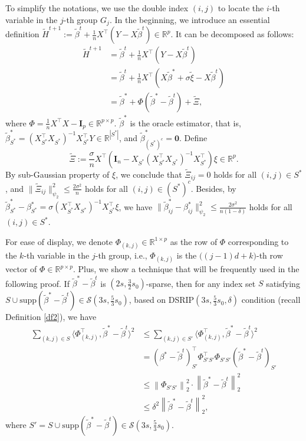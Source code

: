 \documentclass[12pt]{article}
\begin{document}
\begin{appendix}
To simplify the notations, we use the double index $(i,j)$ to locate the $i$-th variable in the $j$-th group $G_j$.
In the beginning, we introduce an essential definition $\tilde H^{t+1} := \tilde \beta^{t } + \frac1nX^\top \left(Y-X\tilde \beta^{t} \right) \in \mathbb R^p$.
It can be decomposed as follows: 
\begin{align*}
\tilde H^{t+1} &=  \tilde \beta^{t } + \frac1nX^\top \left(Y-X\tilde \beta^{t } \right) \\
&=  \tilde \beta^{t } + \frac1nX^\top \left(X \tilde \beta^* + \sigma \tilde \xi -X\tilde \beta^{t } \right) \\
&= \tilde \beta^* +  {\Phi} (\tilde\beta^*- \tilde \beta^t) + \tilde \Xi,
\end{align*}
where ${\Phi} = \frac1nX^\top X -\mathbf I_p \in \mathbb R^{p \times p}$.
$\tilde \beta^*$ is the oracle estimator, that is, $\tilde \beta_{S^*}^* = (X_{S^*}^\top X_{S^*})^{-1}X_{S^*}^\top Y \in \mathbb R^{|S^*|}$, and $\tilde \beta_{(S^*)^c}^*=\mathbf 0$. 
Define 
$$\tilde \Xi := \frac\sigma n X^\top \left(\mathbf I_n - X_{S^*} (X_{S^*}^\top X_{S^*})^{-1}X_{S^*}^\top \right) \xi \in \mathbb R^p.$$
By sub-Gaussian property of $\xi$, we conclude that $\tilde \Xi_{ij} =0$ holds for all $ (i,j) \in S^* $, and $\|\tilde \Xi_{ij}\|_{\psi_2}^2 \le \frac{2\sigma^2}{n}$ holds for all $ (i,j) \in (S^*)^c$. 
Besides, by $\tilde \beta_{S^*}^* - \beta^*_{S^*}
= \sigma (X_{S^*}^\top X_{S^*})^{-1}X_{S^*}^\top \xi$, we have $ \|\tilde \beta_{ij}^* - \beta^*_{ij}\|_{\psi_2}^2 \le \frac{2\sigma^2}{n(1-\delta)}$ holds for all $ (i,j) \in S^*$.

For ease of display, we denote ${\Phi}_{(k,j)} \in \mathbb R^{1 \times p}$ as the row of ${\Phi}$ corresponding to the $k$-th variable in the $j$-th group, i.e., ${\Phi}_{(k,j)}$ is the $\big((j-1)d+k\big)$-th row vector of ${\Phi} \in \mathbb R^{p \times p}$.
Plus, we show a technique that will be frequently used in the following proof. If $\tilde\beta^* - \tilde\beta^{t}$ is $ (2s, \frac32 s_0)$-sparse, then for any index set $S$ satisfying  $ S \cup \text{supp}(\tilde\beta^* - \tilde\beta^{t}) \in \mathcal S (3s,\frac53 s_0)$, based on DSRIP$(3s,\frac53 s_0, \delta)$ condition (recall Definition \ref{df2}), we have
\begin{equation}\label{tech}
\begin{aligned}
\sum_{(k,j) \in S } \langle{\Phi}_{(k,j)}^\top, \tilde\beta^* - \tilde\beta^{t} \rangle^2
&\le  \sum_{(k,j) \in S'} \langle{\Phi}_{(k,j)}^\top, \tilde\beta^* - \tilde\beta^{t} \rangle^2 \\
&= (\beta^* - \tilde\beta^{t})_{S'}^\top {\Phi}_{S'S'}^\top {\Phi}_{S'S'}(\tilde\beta^* - \tilde\beta^{t})_{S'} \\
&\le \left\| {\Phi}_{S'S'} \right\|_2^2 \cdot \left\|  \tilde\beta^* - \tilde\beta^{t}\right\|_2^2 \\
&\le \delta^2 \left\| \tilde \beta^* - \tilde\beta^{t}\right\|_2^2,
\end{aligned}
\end{equation}
where $S' = S \cup \text{supp}(\tilde\beta^* - \tilde\beta^{t}) \in \mathcal S (3s,\frac53 s_0)$.


\end{appendix}
\end{document}
